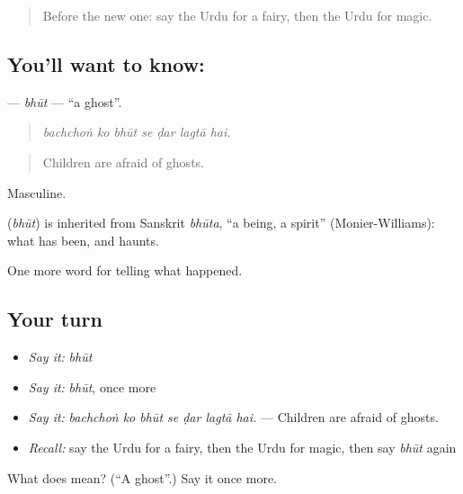 \begin{quote}
Before the new one: say the Urdu for a fairy, then the Urdu for magic.
\end{quote}

\subsection*{You'll want to know: }
\textbf{} — \emph{bhūt} — \textquotedblleft{}a ghost\textquotedblright{}.

\begin{quote}
      
\end{quote}

\begin{quote}
\emph{bachchoṅ ko bhūt se ḍar lagtā hai.}
\end{quote}

\begin{quote}
Children are afraid of ghosts.
\end{quote}

Masculine.

\begin{cousinweb}
\textbf{} (\emph{bhūt}) is inherited from Sanskrit \emph{bhūta}, \textquotedblleft{}a being, a spirit\textquotedblright{} (Monier-Williams): what has been, and haunts.
\end{cousinweb}

\begin{grammarlens}[title={What you've built}]
One more word for telling what happened.
\end{grammarlens}

\subsection*{Your turn}
\begin{itemize}
\raggedright
  \item \emph{Say it:} \emph{bhūt}
  \item \emph{Say it:} \emph{bhūt}, once more
  \item \emph{Say it:} \emph{bachchoṅ ko bhūt se ḍar lagtā hai.} — Children are afraid of ghosts.
  \item \emph{Recall:} say the Urdu for a fairy, then the Urdu for magic, then say \emph{bhūt} again
\end{itemize}

\begin{tcolorbox}[breakable,colback=teal!4,colframe=teal!35!black,title={Before you move on}]
What does  mean? (\textquotedblleft{}A ghost\textquotedblright{}.) Say it once more.
\end{tcolorbox}

